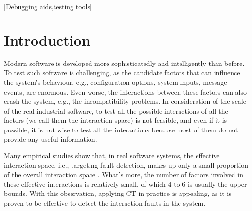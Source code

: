 \documentclass{sig-alternate}
\begin{document}
[Debugging aids,testing tools]



\section{Introduction}

Modern software is developed more sophisticatedly and intelligently than before. To test such software is challenging, as the candidate factors that can influence the system's behaviour, e.g., configuration options, system inputs, message events, are enormous. Even worse, the interactions between these factors can also crash the system, e.g., the incompatibility problems. In consideration of the scale of the real industrial software, to test all the possible interactions of all the factors (we call them the interaction space) is not feasible, and even if it is possible, it is not wise to test all the interactions because most of them do not provide any useful information.

Many empirical studies show that, in real software systems, the effective interaction space, i.e., targeting fault detection, makes up only a small proportion of the overall interaction space \cite{kuhn2002investigation,kuhn2004software}. What's more, the number of factors involved in these effective interactions is relatively small, of which 4 to 6 is usually the upper bounds\cite{kuhn2002investigation}. With this observation, applying CT in practice is appealing, as it is proven to be effective to detect the interaction faults in the system.
\end{document}
